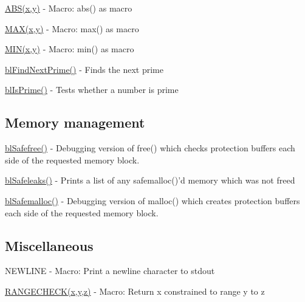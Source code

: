 \begin{DoxyItemize}
\item \hyperlink{macros_8h_a996f7be338ccb40d1a2a5abc1ad61759}{A\-B\-S(x,y)} -\/ Macro\-: abs() as macro
\item \hyperlink{macros_8h_afa99ec4acc4ecb2dc3c2d05da15d0e3f}{M\-A\-X(x,y)} -\/ Macro\-: max() as macro
\item \hyperlink{macros_8h_a3acffbd305ee72dcd4593c0d8af64a4f}{M\-I\-N(x,y)} -\/ Macro\-: min() as macro
\item \hyperlink{_math_util_8h_a1f7a32478dd010effe9291ad8b9ff5ef}{bl\-Find\-Next\-Prime()} -\/ Finds the next prime
\item \hyperlink{_math_util_8h_a8710dcd15377c24eb078a9621f872fff}{bl\-Is\-Prime()} -\/ Tests whether a number is prime
\end{DoxyItemize}

\subsection*{Memory management }


\begin{DoxyItemize}
\item \hyperlink{safemem_8c_a75e4d6982f7cc802621dbc4f776446df}{bl\-Safefree()} -\/ Debugging version of free() which checks protection buffers each side of the requested memory block.
\item \hyperlink{safemem_8c_a32aa9f6dc5a258fd19c0523385d0f33a}{bl\-Safeleaks()} -\/ Prints a list of any safemalloc()'d memory which was not freed
\item \hyperlink{safemem_8c_a6fb1420daf9aae70c83e9cd558bce4f7}{bl\-Safemalloc()} -\/ Debugging version of malloc() which creates protection buffers each side of the requested memory block.
\end{DoxyItemize}

\subsection*{Miscellaneous }


\begin{DoxyItemize}
\item N\-E\-W\-L\-I\-N\-E -\/ Macro\-: Print a newline character to stdout
\item \hyperlink{macros_8h_a1f257cea576b885c9a24e42009e95467}{R\-A\-N\-G\-E\-C\-H\-E\-C\-K(x,y,z)} -\/ Macro\-: Return x constrained to range y to z
\end{DoxyItemize}

